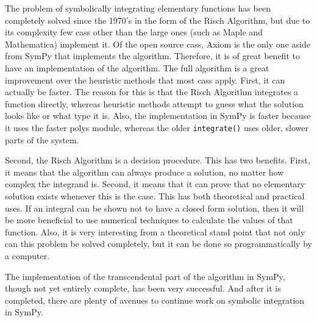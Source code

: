 The problem of symbolically integrating \gls{elementary} functions has
been completely solved since the 1970's in the form of the Risch
Algorithm, but due to its complexity few \glspl{cas} other than the
large ones (such as Maple and Mathematica) implement it.  Of the open
source \glspl{cas}, Axiom is the only one aside from SymPy that
implements the algorithm.  Therefore, it is of great benefit to have an
implementation of the algorithm.  The full algorithm is a great
improvement over the heuristic methods that most \glspl{cas} apply. 
First, it can actually be faster.  The reason for this is that the Risch
Algorithm integrates a function directly, whereas heuristic methods
attempt to guess what the solution looks like or what type it is.  Also,
the \rischintegrate{} implementation in SymPy is faster because it uses
the faster polys module, whereas the older \texttt{integrate()} uses
older, slower parts of the system.

Second, the Risch Algorithm is a decision procedure.  This has two
benefits.  First, it means that the algorithm can always produce a
solution, no matter how complex the \gls{integrand} is.  Second, it
means that it can prove that no \gls{elementary} solution exists
whenever this is the case. This has both theoretical and practical uses.
 If an integral can be shown not to have a closed form solution, then it
will be more beneficial to use numerical techniques to calculate the
values of that function.  Also, it is very interesting from a
theoretical stand point that not only can this problem be solved
completely, but it can be done so programmatically by a computer.

The implementation of the \gls{transcendental} part of the algorithm in
SymPy, though not yet entirely complete, has been very successful. 
And after it is completed, there are plenty of avenues to continue work on
symbolic integration in SymPy.
